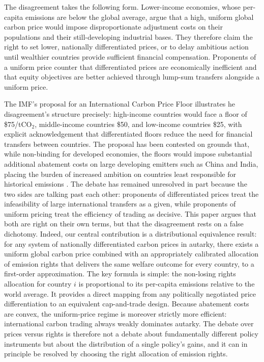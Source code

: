 \documentclass[12pt,english]{article}
\begin{document}
The disagreement takes the following form. Lower-income economies, whose per-capita emissions are below the global average, argue that a high, uniform global carbon price would impose disproportionate adjustment costs on their populations and their still-developing industrial bases. They therefore claim the right to set lower, nationally differentiated prices, or to delay ambitious action until wealthier countries provide sufficient financial compensation. Proponents of a uniform price counter that differentiated prices are economically inefficient and that equity objectives are better achieved through lump-sum transfers alongside a uniform price. 

The IMF's proposal for an International Carbon Price Floor \citep{parry2021} illustrates he disagreement's structure precisely: high-income countries would face a floor of \$75/tCO$_2$, middle-income countries \$50, and low-income countries \$25, with explicit acknowledgement that differentiated floors reduce the need for financial transfers between countries. The proposal has been contested on grounds that, while non-binding for developed economies, the floors would impose substantial additional abatement costs on large developing emitters such as China and India, placing the burden of increased ambition on countries least responsible for historical emissions \citep{majun2022}. The debate has remained unresolved in part because the two sides are talking past each other: proponents of differentiated prices treat the infeasibility of large international transfers as a given, while proponents of uniform pricing treat the efficiency of trading as decisive. This paper argues that both are right on their own terms, but that the disagreement rests on a false dichotomy. Indeed, our central contribution is a distributional equivalence result: for any system of nationally differentiated carbon prices in autarky, there exists a uniform global carbon price combined with an appropriately calibrated allocation of emission rights that delivers the same welfare outcome for every country, to a first-order approximation. The key formula is simple: the non-losing rights allocation for country $i$ is proportional to its per-capita emissions relative to the world average. It provides a direct mapping from any politically negotiated price differentiation to an equivalent cap-and-trade design. Because abatement costs are convex, the uniform-price regime is moreover strictly more efficient: international carbon trading always weakly dominates autarky. The debate over prices versus rights is therefore not a debate about fundamentally different policy instruments but about the distribution of a single policy's gains, and it can in principle be resolved by choosing the right allocation of emission rights.
\end{document}
